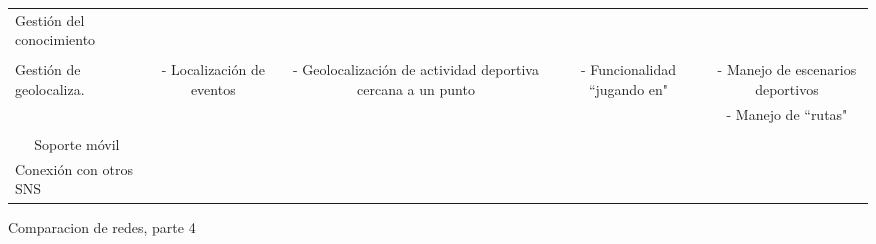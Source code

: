 \begin{landscape}
\begin{table}
\begin{center}
{\begin{tabular}{|l|llll|}
\hline
Gestión del conocimiento & \multicolumn{1}{c}{} & \multicolumn{1}{c}{} & \multicolumn{1}{c}{} & \multicolumn{1}{c|}{} \\ 
 & \multicolumn{1}{c}{} & \multicolumn{1}{c}{} & \multicolumn{1}{c}{} & \multicolumn{1}{c|}{} \\ 
\hline
Gestión de geolocaliza. & \multicolumn{1}{c}{- Localización de eventos} & \multicolumn{1}{c}{- Geolocalización de actividad deportiva cercana a un punto} & \multicolumn{1}{c}{- Funcionalidad ``jugando en"} & \multicolumn{1}{c|}{- Manejo de escenarios deportivos} \\ 
 & \multicolumn{1}{c}{} & \multicolumn{1}{c}{} & \multicolumn{1}{c}{} & \multicolumn{1}{c|}{- Manejo de ``rutas"} \\ 
 & \multicolumn{1}{c}{} & \multicolumn{1}{c}{} & \multicolumn{1}{c}{} & \multicolumn{1}{c|}{} \\ 
\hline
\multicolumn{1}{|c|}{Soporte móvil} & \multicolumn{1}{c}{} & \multicolumn{1}{c}{} & \multicolumn{1}{c}{} & \multicolumn{1}{c|}{} \\ 
\hline
Conexión con otros SNS & \multicolumn{1}{c}{} & \multicolumn{1}{c}{} & \multicolumn{1}{c}{} & \multicolumn{1}{c|}{} \\ 
\hline
\end{tabular}
}
  
  \end{center}
\end{table}

\newpage

\begin{table}
  \caption{Comparacion de redes, parte 4}
  \label{tab:comparacion_redes_4}


\end{table}
\end{landscape}
